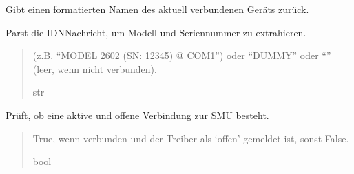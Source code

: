 \documentclass[letterpaper,10pt,english]{sphinxmanual}
\begin{document}
\begin{fulllineitems}
\begin{fulllineitems}
\label{\detokenize{modulab/smu_manager:modules.smu.SmuManager.SmuManager.get_activeDeviceName}}
\pysigstartsignatures
\pysiglinewithargsret
{}
{}
{}
\pysigstopsignatures
\sphinxAtStartPar
Gibt einen formatierten Namen des aktuell verbundenen Geräts zurück.

\sphinxAtStartPar
Parst die IDN\sphinxhyphen{}Nachricht, um Modell und Seriennummer zu extrahieren.
\begin{quote}\begin{description}
\sphinxAtStartPar
\begin{description}
\sphinxAtStartPar
(z.B. “MODEL 2602 (SN: 12345) @ COM1”)
oder “DUMMY” oder “” (leer, wenn nicht verbunden).

\end{description}


\sphinxAtStartPar
str

\end{description}\end{quote}

\end{fulllineitems}


\begin{fulllineitems}
\label{\detokenize{modulab/smu_manager:modules.smu.SmuManager.SmuManager.is_connected}}
\pysigstartsignatures
\pysiglinewithargsret
{}
{}
{}
\pysigstopsignatures
\sphinxAtStartPar
Prüft, ob eine aktive und offene Verbindung zur SMU besteht.
\begin{quote}\begin{description}
\sphinxAtStartPar
True, wenn verbunden und der Treiber als ‘offen’ gemeldet ist, sonst False.

\sphinxAtStartPar
bool

\end{description}\end{quote}

\end{fulllineitems}



\end{fulllineitems}
\end{document}
